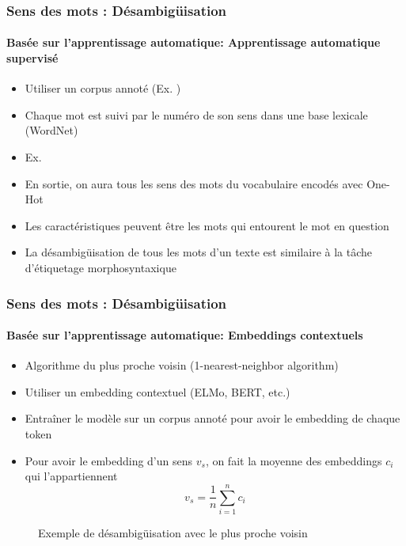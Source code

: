 \documentclass[xcolor=table]{beamer}
\begin{document}
\begin{frame}
\frametitle{Sens des mots : Désambigüisation}
\framesubtitle{Basée sur l'apprentissage automatique: Apprentissage automatique supervisé}
	
\begin{itemize}
	\item Utiliser un corpus annoté (Ex. )
	\item Chaque mot est suivi par le numéro de son sens dans une base lexicale (WordNet)
	\item Ex. 
	\item En sortie, on aura tous les sens des mots du vocabulaire encodés avec One-Hot
	\item Les caractéristiques peuvent être les mots qui entourent le mot en question
	\item La désambigüisation de tous les mots d'un texte est similaire à la tâche d'étiquetage morphosyntaxique
\end{itemize}
	
\end{frame}

\begin{frame}
\frametitle{Sens des mots : Désambigüisation}
\framesubtitle{Basée sur l'apprentissage automatique: Embeddings contextuels}

\begin{minipage}{.68\textwidth}
\begin{itemize}
	\item Algorithme du plus proche voisin (1-nearest-neighbor algorithm) 
	\item Utiliser un embedding contextuel (ELMo, BERT, etc.)
	\item Entraîner le modèle sur un corpus annoté pour avoir le embedding de chaque token
	\item Pour avoir le embedding d'un sens $v_s$, on fait la moyenne des embeddings $c_i$ qui l'appartiennent
	\[ v_s = \frac{1}{n} \sum_{i=1}^{n} c_i \] 
\end{itemize}
\end{minipage}
\begin{minipage}{.3\textwidth}
	\begin{figure}
		\caption{Exemple de désambigüisation avec le plus proche voisin \cite{2019-jurafsky-martin}}
	\end{figure}
\end{minipage}

\end{frame}

\end{document}

